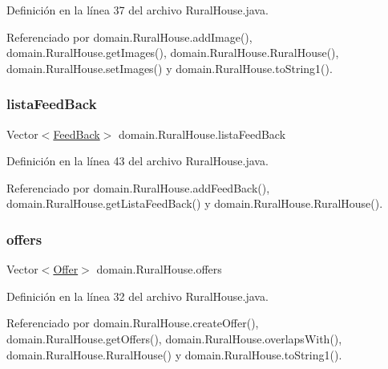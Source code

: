 Definición en la línea 37 del archivo Rural\+House.\+java.



Referenciado por domain.\+Rural\+House.\+add\+Image(), domain.\+Rural\+House.\+get\+Images(), domain.\+Rural\+House.\+Rural\+House(), domain.\+Rural\+House.\+set\+Images() y domain.\+Rural\+House.\+to\+String1().

\mbox{\label{classdomain_1_1_rural_house_a9ea6b00b3801e89619b93ba995b0ec32}} 
\subsubsection{\texorpdfstring{listaFeedBack}{listaFeedBack}}
{\footnotesize\ttfamily Vector$<$\mbox{\hyperlink{classdomain_1_1_feed_back}{Feed\+Back}}$>$ domain.\+Rural\+House.\+lista\+Feed\+Back\hspace{0.3cm}{\ttfamily [private]}}



Definición en la línea 43 del archivo Rural\+House.\+java.



Referenciado por domain.\+Rural\+House.\+add\+Feed\+Back(), domain.\+Rural\+House.\+get\+Lista\+Feed\+Back() y domain.\+Rural\+House.\+Rural\+House().

\mbox{\label{classdomain_1_1_rural_house_a3988c813bc7b8918e515b161bc3cdd20}} 
\subsubsection{\texorpdfstring{offers}{offers}}
{\footnotesize\ttfamily Vector$<$\mbox{\hyperlink{classdomain_1_1_offer}{Offer}}$>$ domain.\+Rural\+House.\+offers}



Definición en la línea 32 del archivo Rural\+House.\+java.



Referenciado por domain.\+Rural\+House.\+create\+Offer(), domain.\+Rural\+House.\+get\+Offers(), domain.\+Rural\+House.\+overlaps\+With(), domain.\+Rural\+House.\+Rural\+House() y domain.\+Rural\+House.\+to\+String1().

